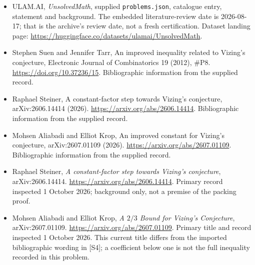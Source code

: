 \documentclass[11pt,a4paper]{article}
\begin{document}
{\small

\begin{itemize}

\item[\hypertarget{source:statement:1}{S1}] ULAM.AI, \emph{UnsolvedMath}, supplied \texttt{problems.json}, catalogue entry, statement and background. The embedded literature-review date is 2026-08-17; that is the archive’s review date, not a fresh certification. Dataset landing page: \url{https://huggingface.co/datasets/ulamai/UnsolvedMath}.

\item[\hypertarget{source:statement:2}{S2}] Stephen Suen and Jennifer Tarr, An improved inequality related to Vizing's conjecture, Electronic Journal of Combinatorics 19 (2012), \#P8. \url{https://doi.org/10.37236/15}. Bibliographic information from the supplied record.

\item[\hypertarget{source:statement:3}{S3}] Raphael Steiner, A constant-factor step towards Vizing's conjecture, arXiv:2606.14414 (2026). \url{https://arxiv.org/abs/2606.14414}. Bibliographic information from the supplied record.

\item[\hypertarget{source:statement:4}{S4}] Mohsen Aliabadi and Elliot Krop, An improved constant for Vizing's conjecture, arXiv:2607.01109 (2026). \url{https://arxiv.org/abs/2607.01109}. Bibliographic information from the supplied record.


\item[E1] Raphael Steiner, \emph{A constant-factor
step towards Vizing's conjecture}, arXiv:2606.14414.
\url{https://arxiv.org/abs/2606.14414}. Primary record inspected
1 October 2026; background only, not a premise of the packing proof.
\item[E2] Mohsen Aliabadi and Elliot Krop, \emph{A $2/3$ Bound for
Vizing's Conjecture}, arXiv:2607.01109.
\url{https://arxiv.org/abs/2607.01109}. Primary title and record
inspected 1 October 2026. This current title differs from the imported
bibliographic wording in [S4]; a coefficient below one is not the
full inequality recorded in this problem.

\end{itemize}

}

\label{end:statement}
\end{document}
